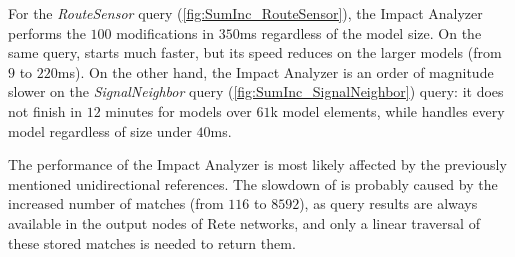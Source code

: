 For the \emph{RouteSensor} query (\autoref{fig:SumInc_RouteSensor}), the Impact
Analyzer performs the $100$ modifications in $350$ms regardless of the model
size. On the same query, \incquery{} starts much faster, but its speed reduces
on the larger models (from $9$ to $220$ms). On the other hand, the Impact
Analyzer is an order of magnitude slower on the \emph{SignalNeighbor} query
(\autoref{fig:SumInc_SignalNeighbor}) query: it does not finish in $12$ minutes
for models over $61$k model elements, while \incquery{} handles every model
regardless of size under $40$ms.

The performance of the Impact Analyzer is most likely affected by the previously
mentioned unidirectional references. The slowdown of \incquery{} is probably
caused by the increased number of matches (from $116$ to $8592$), as query
results are always available in the output nodes of Rete networks, and only a
linear traversal of these stored matches is needed to return them.


